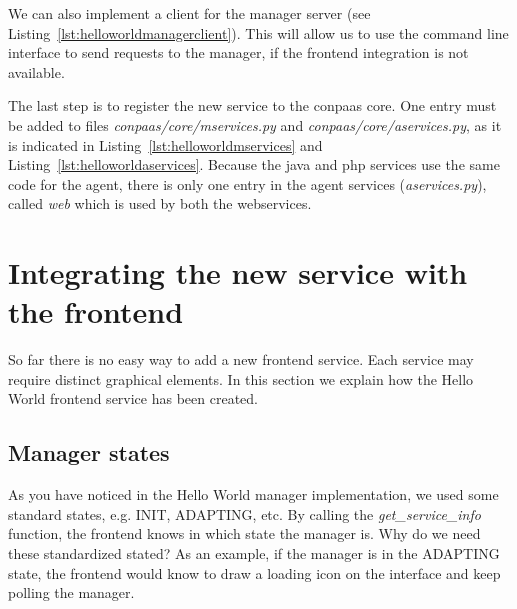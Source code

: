 \documentclass[10pt]{article}
\newcommand{\ConPaaSHOME}{../conpaas-services}
\begin{document}


We can also implement a client for the manager server (see Listing~\ref{lst:helloworldmanagerclient}). This will allow us to use the command line interface to send requests to the manager, if the frontend integration is not available.



The last step is to register the new service to the conpaas core. One entry must be added to files \textit{conpaas/core/mservices.py} and \textit{conpaas/core/aservices.py}, as it is indicated in Listing~\ref{lst:helloworldmservices} and Listing~\ref{lst:helloworldaservices}. Because the java and php services use the same code for the agent, there is only one entry in the agent services (\textit{aservices.py}), called \textit{web} which is used by both the webservices.





\section{Integrating the new service with the frontend}

So far there is no easy way to add a new frontend service. Each service may require distinct graphical elements. In this section we explain how the Hello World frontend service has been created.

\subsection{Manager states}
As you have noticed in the Hello World manager implementation, we used some standard states, e.g. INIT, ADAPTING, etc. By calling the \textit{get\_service\_info} function, the frontend knows in which state the manager is. Why do we need these standardized stated? As an example, if the manager is in the ADAPTING state, the frontend would know to draw a loading icon on the interface and keep polling the manager. 
\end{document}
